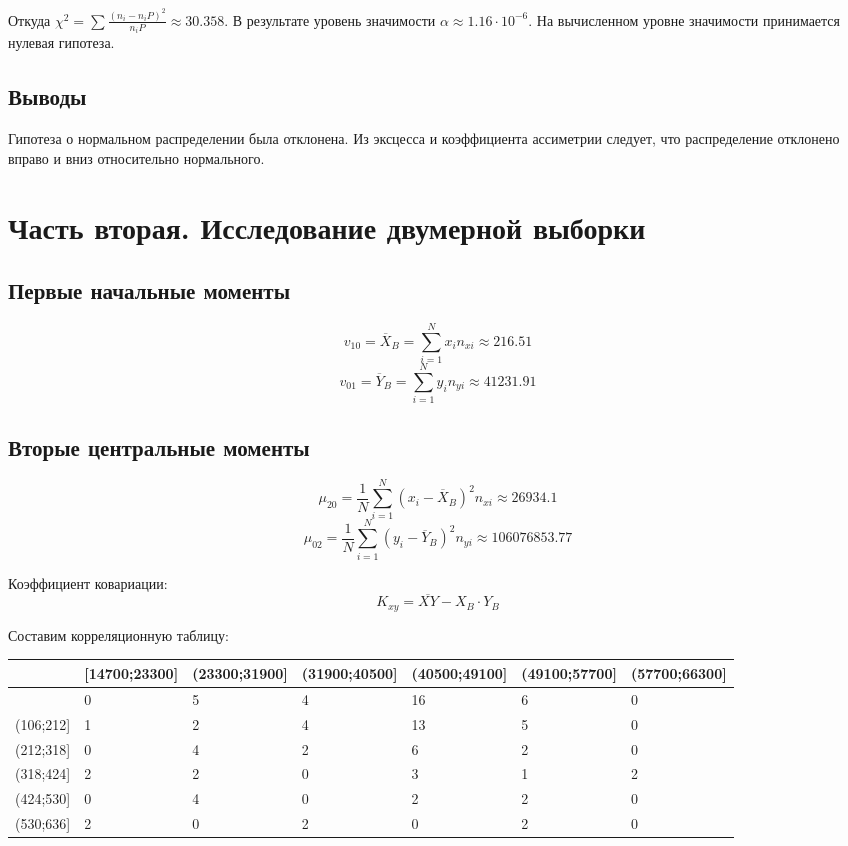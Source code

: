\documentclass[titlepage]{article}
\begin{document}
Откуда $\chi^2 = \sum \frac{(n_i - n_i P)^2}{n_i P} \approx 30.358$. В результате уровень значимости $\alpha \approx 1.16 \cdot 10^{-6}$. На вычисленном уровне значимости принимается нулевая гипотеза.

\subsection{Выводы}
Гипотеза о нормальном распределении была отклонена. Из эксцесса и коэффициента ассиметрии следует, что распределение отклонено вправо и вниз относительно нормального.

\section{Часть вторая. Исследование двумерной выборки}
\subsection{Первые начальные моменты}
\begin{equation*}
v_{10} = \overline{X}_B = \sum_{i=1}^N x_i n_{xi} \approx 216.51
\end{equation*}
\begin{equation*}
v_{01} = \overline{Y}_B = \sum_{i=1}^N y_i n_{yi} \approx 41231.91
\end{equation*}

\subsection{Вторые центральные моменты}
\begin{equation*}
\mu_{20} = \frac{1}{N} \sum_{i = 1}^N (x_i - \overline{X}_B)^2 n_{xi} \approx 26934.1
\end{equation*}
\begin{equation*}
\mu_{02} = \frac{1}{N} \sum_{i = 1}^N (y_i - \overline{Y}_B)^2 n_{yi} \approx 106076853.77
\end{equation*}

Коэффициент ковариации:
\begin{equation*}
K_{xy} = \overline{XY} - X_B \cdot Y_B
\end{equation*}

\clearpage
Составим корреляционную таблицу:
\begin{table}[!ht]
    \centering
    \begin{tabular}{|l|l|l|l|l|l|l|}
    \hline
        ~ & [14700;23300] & (23300;31900] & (31900;40500] & (40500;49100] & (49100;57700] & (57700;66300] \\ \hline
        [0;106] & 0 & 5 & 4 & 16 & 6 & 0 \\ \hline
        (106;212] & 1 & 2 & 4 & 13 & 5 & 0 \\ \hline
        (212;318] & 0 & 4 & 2 & 6 & 2 & 0 \\ \hline
        (318;424] & 2 & 2 & 0 & 3 & 1 & 2 \\ \hline
        (424;530] & 0 & 4 & 0 & 2 & 2 & 0 \\ \hline
        (530;636] & 2 & 0 & 2 & 0 & 2 & 0 \\ \hline
    \end{tabular}
\end{table}
\end{document}
